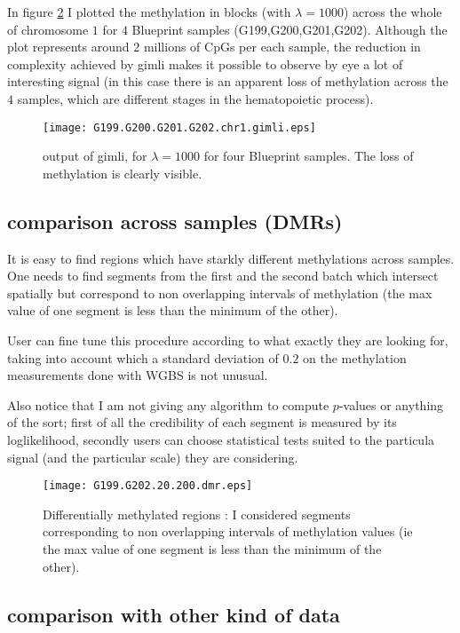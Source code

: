 \documentclass[11pt]{amsart}
\begin{document}
In figure \ref{ex1} I plotted the methylation in blocks (with $\lambda=1000$) 
across the whole of chromosome $1$ for $4$ Blueprint samples
(G199,G200,G201,G202). Although the plot represents around $2$ millions of 
CpGs per each sample, the reduction in complexity achieved by gimli makes it 
possible to observe by eye a lot of interesting signal (in this case there is 
an apparent loss of methylation across the $4$ samples, which are different 
stages in the hematopoietic process).

\begin{figure}\label{ex1}
\texttt{[image: G199.G200.G201.G202.chr1.gimli.eps]}
\caption{output of gimli, for $\lambda=1000$ for four Blueprint samples. The loss of
methylation is clearly visible.}
\end{figure}

\subsection{comparison across samples (DMRs)}

It is easy to find regions which have starkly different 
methylations across samples. One needs to find segments 
from the first and the second batch which intersect spatially
but correspond to non overlapping intervals of methylation 
(the max value of one 
segment is less than the minimum of the other).

User can fine tune this procedure according to what exactly they 
are looking for, taking into account which a standard deviation of $0.2$
on the methylation measurements done with WGBS is not unusual.

Also notice that I am not giving any algorithm to compute $p$-values
or anything of the sort; first of all the credibility of each segment
is measured by its loglikelihood, secondly users can choose statistical
tests suited to the particula signal (and the particular scale)
they are considering.

\begin{figure}\label{ex1}
\texttt{[image: G199.G202.20.200.dmr.eps]}
\caption{Differentially methylated regions : I considered segments corresponding to
non overlapping intervals of methylation values (ie the max value of one 
segment is less than the minimum of the other).}
\end{figure}

\subsection{comparison with other kind of data}
\end{document}
